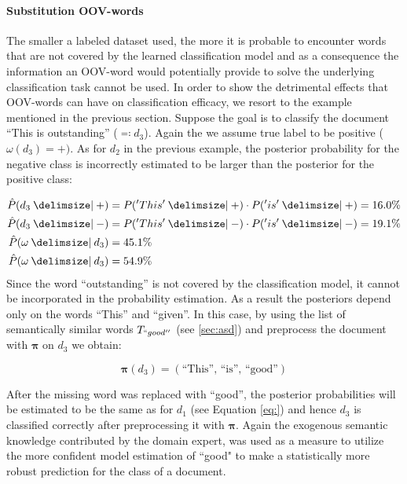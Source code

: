 \paragraph{Substitution OOV-words}
The smaller a labeled dataset used, the more it is probable to encounter words
that are not covered by the learned classification model and as a consequence
the information an OOV-word would potentially provide to solve the underlying
classification task cannot be used. In order to show the detrimental effects that OOV-words can
have on classification efficacy, we resort to the example mentioned in the
previous section. Suppose the goal is to classify the document ``This is
outstanding'' ($\eqqcolon d_3$). Again the we assume true label to be positive
($\omega(d_3) = +)$. As for $d_2$ in the previous example, the
posterior probability for the negative class is incorrectly estimated to be
larger than the posterior for the positive class:

\begin{equation*}
\begin{split}
	\hat{P}(d_3 \given +) &=  P('This' \given +) \cdot P('is' \given +) = 16.0 \%
	\\
	\hat{P}(d_3 \given -) &=  P('This' \given -) \cdot P('is' \given -) = 19.1 \%
	\\
	\hat{P}(\omega \given d_3) &= 45.1 \% \\
	\hat{P}(\omega \given d_3) &= 54.9 \%	
\end{split}
\end{equation*}
Since the word ``outstanding'' is not covered by the classification model, it
cannot be incorporated in the probability estimation. As a result the
posteriors depend only on the words ``This'' and ``given''.
In this case, by using the list of semantically similar words $T_{``good''}$
(see \ref{sec:asd}) and preprocess the document with $\boldsymbol \pi$ on $d_3$ we obtain: 

\begin{equation*}
\boldsymbol\pi(d_3) = (\text{``This'', ``is'', ``good''})
\end{equation*}

After the missing word was replaced with ``good'', the posterior probabilities
will be estimated to be the same as for $d_1$ (see Equation \ref{eq:}) and
hence $d_3$ is classified correctly after preprocessing it with
$\boldsymbol\pi$.
Again the exogenous semantic knowledge contributed by the domain expert, was
used as a measure to utilize the more confident model estimation of ``good" to
make a statistically more robust prediction for the class of a document.

